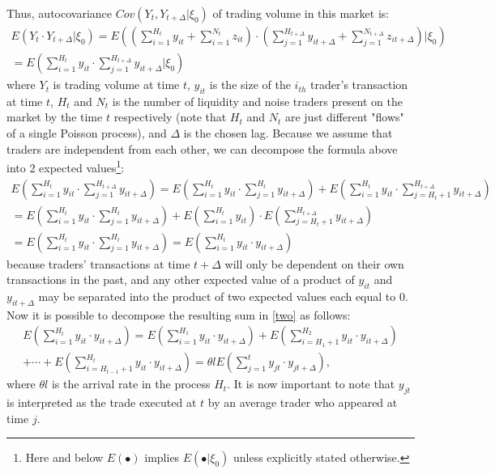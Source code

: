 \documentclass[12pt]{article}
\begin{document}
Thus, autocovariance $Cov(Y_t,Y_{t+\Delta}\vert\xi_0)$ of trading volume in this market is:
\begin{equation}\label{one}
\begin{gathered}
E(Y_t\cdot Y_{t+\Delta}\vert\xi_0)=E((\sum\limits_{i=1}^{H_t}y_{it}+\sum\limits_{i=1}^{N_t}z_{it})\cdot
(\sum\limits_{j=1}^{H_{t+\Delta}}y_{it+\Delta}+\sum\limits_{j=1}^{N_{t+\Delta}}z_{it+\Delta})\vert\xi_0)\\
=E(\sum\limits_{i=1}^{H_t}y_{it}\cdot\sum\limits_{j=1}^{H_{t+\Delta}}y_{it+\Delta}\vert\xi_0)
\end{gathered}
\end{equation}
where $Y_t$ is trading volume at time $t$, $y_{it}$ is the size of the $i_{th}$ trader's transaction at time $t$, $H_t$ and $N_t$ is the number of liquidity and noise traders present on the market by the time $t$ respectively (note that $H_t$ and $N_t$ are just different "flows" of a single Poisson process), and $\Delta$ is the chosen lag. Because we assume that traders are independent from each other, we can decompose the formula above into 2 expected values\footnote[$\ast$]{Here and below $E(•)$ implies $E(•\vert\xi_0)$ unless explicitly stated otherwise.}:
\begin{equation}\label{two}
\begin{gathered}
E(\sum\limits_{i=1}^{H_t}y_{it}\cdot\sum\limits_{j=1}^{H_{t+\Delta}}y_{it+\Delta})=
E(\sum\limits_{i=1}^{H_t}y_{it}\cdot\sum\limits_{j=1}^{H_{t}}y_{it+\Delta})+
E(\sum\limits_{i=1}^{H_t}y_{it}\cdot\sum\limits_{j=H_t+1}^{H_{t+\Delta}}y_{it+\Delta})\\=
E(\sum\limits_{i=1}^{H_t}y_{it}\cdot\sum\limits_{j=1}^{H_{t}}y_{it+\Delta})+
E(\sum\limits_{i=1}^{H_t}y_{it})\cdot E(\sum\limits_{j=H_t+1}^{H_{t+\Delta}}y_{it+\Delta})
\\=E(\sum\limits_{i=1}^{H_t}y_{it}\cdot\sum\limits_{j=1}^{H_{t}}y_{it+\Delta})=
E(\sum\limits_{i=1}^{H_t}y_{it}\cdot y_{it+\Delta})
\end{gathered}
\end{equation}
because traders' transactions at time $t+\Delta$ will only be dependent on their own transactions in the past, and any other expected value of a product of $y_{it}$ and $y_{it+\Delta}$ may be separated into the product of two expected values each equal to 0. Now it is possible to decompose the resulting sum in \eqref{two} as follows:
\begin{equation}\label{three}
\begin{gathered}
E(\sum\limits_{i=1}^{H_t}y_{it}\cdot y_{it+\Delta})=E(\sum\limits_{i=1}^{H_1}y_{it}\cdot y_{it+\Delta})+E(\sum\limits_{i=H_1+1}^{H_2}y_{it}\cdot y_{it+\Delta})\\
+\dotsb+E(\sum\limits_{i=H_{t-1}+1}^{H_t}y_{it}\cdot y_{it+\Delta})=\theta l E(\sum\limits_{j=1}^{t}y_{jt}\cdot y_{jt+\Delta}),
\end{gathered}
\end{equation}
where $\theta l$ is the arrival rate in the process $H_t$. It is now important to note that $y_{jt}$ is interpreted as the trade executed at $t$ by an average trader who appeared at time $j$.
\end{document}

